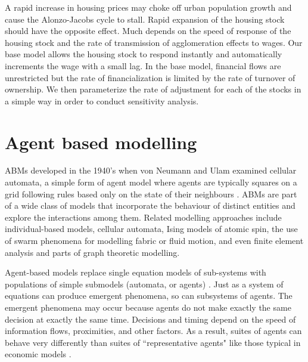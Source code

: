 A rapid increase in housing prices may choke off urban population growth and cause the \Gls{Alonzo-Jacobs cycle} to stall. Rapid expansion of the housing stock should have the opposite effect. Much depends on the speed of response of the housing stock and the rate of transmission of agglomeration effects to wages. Our base model allows the housing stock to respond instantly and automatically increments the wage with a small lag. In the base model, financial flows are unrestricted but the rate of financialization is limited by the rate of turnover of ownership. We then parameterize the rate of adjustment for each of the stocks in a simple way in order to conduct sensitivity analysis.


\section{Agent based modelling}

ABMs developed in the 1940's when von Neumann and Ulam examined cellular automata, a simple form of agent model where agents are typically squares on a grid following rules based only on the state of their neighbours \cite{banks_statistical_2009}. ABMs %
are part of a wide class of models that incorporate the behaviour of  distinct entities and explore the interactions among them. Related modelling approaches include individual-based models, cellular automata, Ising models of atomic spin, the use of swarm phenomena for modelling fabric or fluid motion, and even finite element analysis and parts of graph theoretic modelling. %

Agent-based models replace single equation models of sub-systems with populations of simple submodels (automata, or agents) \cite{shalizi_methods_2006}. Just as a system of equations can produce emergent phenomena, so can subsystems of agents. The emergent phenomena may occur because agents do not make exactly the same decision at exactly the same time. Decisions and timing depend on the speed of information flows, proximities, and other factors. As a result, suites of agents can behave very differently than suites of  ``representative agents" like those typical in economic models \cite{darley_towards_1999, tesfatsion_agent-based_2002}.


